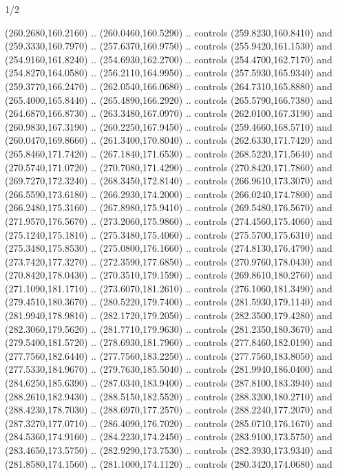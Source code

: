 \begin{flagdescription}{1/2}
\begin{scope}[xshift=0.5\flaglength]
\begin{scope}[scale=0.004\flagwidth,xshift=-90mm,yshift=89mm]
\begin{scope}[y=0.80pt, x=0.80pt, yscale=-1, xscale=1, inner sep=0pt, outer sep=0pt]
  (260.2680,160.2160) .. (260.0460,160.5290) .. controls (259.8230,160.8410) and
  (259.3330,160.7970) .. (257.6370,160.9750) .. controls (255.9420,161.1530) and
  (254.9160,161.8240) .. (254.6930,162.2700) .. controls (254.4700,162.7170) and
  (254.8270,164.0580) .. (256.2110,164.9950) .. controls (257.5930,165.9340) and
  (259.3770,166.2470) .. (262.0540,166.0680) .. controls (264.7310,165.8880) and
  (265.4000,165.8440) .. (265.4890,166.2920) .. controls (265.5790,166.7380) and
  (264.6870,166.8730) .. (263.3480,167.0970) .. controls (262.0100,167.3190) and
  (260.9830,167.3190) .. (260.2250,167.9450) .. controls (259.4660,168.5710) and
  (260.0470,169.8660) .. (261.3400,170.8040) .. controls (262.6330,171.7420) and
  (265.8460,171.7420) .. (267.1840,171.6530) .. controls (268.5220,171.5640) and
  (270.5740,171.0720) .. (270.7080,171.4290) .. controls (270.8420,171.7860) and
  (269.7270,172.3240) .. (268.3450,172.8140) .. controls (266.9610,173.3070) and
  (266.5590,173.6180) .. (266.2930,174.2000) .. controls (266.0240,174.7800) and
  (266.2480,175.3160) .. (267.8980,175.9410) .. controls (269.5480,176.5670) and
  (271.9570,176.5670) .. (273.2060,175.9860) .. controls (274.4560,175.4060) and
  (275.1240,175.1810) .. (275.3480,175.4060) .. controls (275.5700,175.6310) and
  (275.3480,175.8530) .. (275.0800,176.1660) .. controls (274.8130,176.4790) and
  (273.7420,177.3270) .. (272.3590,177.6850) .. controls (270.9760,178.0430) and
  (270.8420,178.0430) .. (270.3510,179.1590) .. controls (269.8610,180.2760) and
  (271.1090,181.1710) .. (273.6070,181.2610) .. controls (276.1060,181.3490) and
  (279.4510,180.3670) .. (280.5220,179.7400) .. controls (281.5930,179.1140) and
  (281.9940,178.9810) .. (282.1720,179.2050) .. controls (282.3500,179.4280) and
  (282.3060,179.5620) .. (281.7710,179.9630) .. controls (281.2350,180.3670) and
  (279.5400,181.5720) .. (278.6930,181.7960) .. controls (277.8460,182.0190) and
  (277.7560,182.6440) .. (277.7560,183.2250) .. controls (277.7560,183.8050) and
  (277.5330,184.9670) .. (279.7630,185.5040) .. controls (281.9940,186.0400) and
  (284.6250,185.6390) .. (287.0340,183.9400) .. controls (287.8100,183.3940) and
  (288.2610,182.9430) .. (288.5150,182.5520) .. controls (288.3200,180.2710) and
  (288.4230,178.7030) .. (288.6970,177.2570) .. controls (288.2240,177.2070) and
  (287.3270,177.0710) .. (286.4090,176.7020) .. controls (285.0710,176.1670) and
  (284.5360,174.9160) .. (284.2230,174.2450) .. controls (283.9100,173.5750) and
  (283.4650,173.5750) .. (282.9290,173.7530) .. controls (282.3930,173.9340) and
  (281.8580,174.1560) .. (281.1000,174.1120) .. controls (280.3420,174.0680) and

\end{scope}
\end{scope}
\end{scope}
\end{flagdescription}
